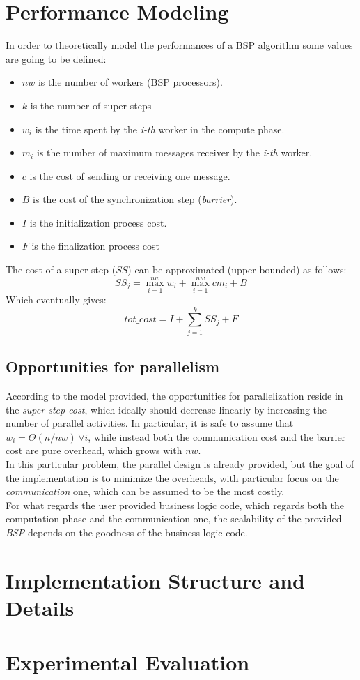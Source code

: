 \documentclass[]{article}
\begin{document}
\section{Performance Modeling}
\label{sec:perfModel}
In order to theoretically model the performances of a BSP algorithm some values are going to be defined:
\begin{itemize}
	\item $\mathit{nw}$ is the number of workers (BSP processors).
	\item $k$ is the number of super steps
	\item $w_i$ is the time spent by the \emph{i-th} worker in the compute phase.
	\item $m_i$ is the number of maximum messages receiver by the \emph{i-th} worker.
	\item $c$ is the cost of sending or receiving one message.
	\item $B$ is the cost of the synchronization step (\emph{barrier}).
	\item $I$ is the initialization process cost.
	\item $F$ is the finalization process cost
\end{itemize}
The cost of a super step ($\mathit{SS}$) can be approximated (upper bounded) as follows:
$$ \mathit{SS}_j = \max_{i=1}^{\mathit{nw}} w_i + \max_{i=1}^{\mathit{nw}} c m_i + B $$
Which eventually gives:
$$ \mathit{tot\_cost} = I + \sum_{j=1}^{k} \mathit{SS}_j + F $$
\subsection{Opportunities for parallelism}
According to the model provided, the opportunities for parallelization reside in the \emph{super step cost}, which ideally should decrease linearly by increasing the number of parallel activities. In particular, it is safe to assume that $w_i = \Theta(n/\mathit{nw}) \, \forall i$, while instead both the communication cost and the barrier cost are pure overhead, which grows with $\mathit{nw}$. \\
In this particular problem, the parallel design is already provided, but the goal of the implementation is to minimize the overheads, with particular focus on the \emph{communication} one, which can be assumed to be the most costly. \\
For what regards the user provided business logic code, which regards both the computation phase and the communication one, the scalability of the provided \emph{BSP} depends on the goodness of the business logic code.

\section{Implementation Structure and Details}
\label{sec:implDetails}

\section{Experimental Evaluation}
\label{sec:eval}
\end{document}

